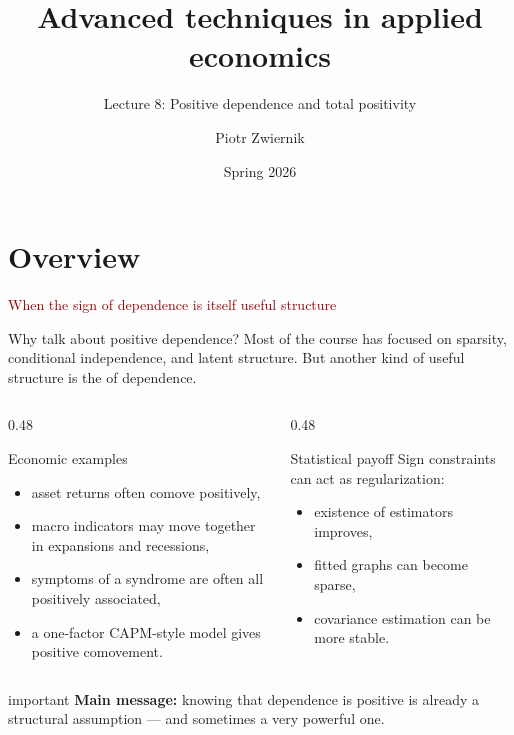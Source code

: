 \documentclass[dvipsnames,aspectratio=169,handout]{beamer}
\title{Advanced techniques in applied economics}
\subtitle{Lecture 8: Positive dependence and total positivity}
\author{Piotr Zwiernik}
\date{Spring 2026}
\begin{document}
\begin{frame}
\titlepage
\end{frame}

\section{Overview}

\begin{frame}{}
\begin{center}
{\huge \textcolor{DarkRed}{When the sign of dependence is itself useful structure}}
\end{center}
\end{frame}

\begin{frame}{Why talk about positive dependence?}
Most of the course has focused on sparsity, conditional independence, and latent structure.
But another kind of useful structure is the  of dependence.

\begin{columns}[T]
\begin{column}{0.48\textwidth}
\begin{block}{Economic examples}
\begin{itemize}
    \item asset returns often comove positively,
    \item macro indicators may move together in expansions and recessions,
    \item symptoms of a syndrome are often all positively associated,
    \item a one-factor CAPM-style model gives positive comovement.
\end{itemize}
\end{block}
\end{column}
\begin{column}{0.48\textwidth}
\begin{block}{Statistical payoff}
Sign constraints can act as regularization:
\begin{itemize}
    \item existence of estimators improves,
    \item fitted graphs can become sparse,
    \item covariance estimation can be more stable.
\end{itemize}
\end{block}
\end{column}
\end{columns}

\begin{beamercolorbox}[wd=\textwidth,sep=8pt,center,rounded=true,shadow=true]{important}
\textbf{Main message:}
knowing that dependence is positive is already a structural assumption --- and sometimes a very powerful one.
\end{beamercolorbox}
\end{frame}
\end{document}
